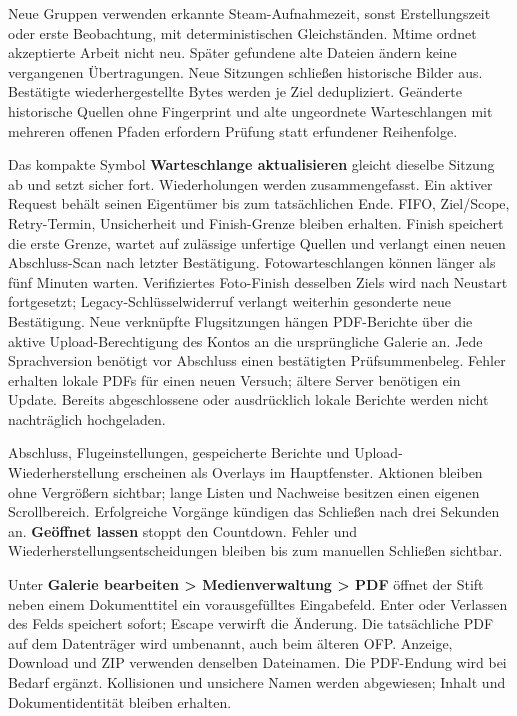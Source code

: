 \documentclass[11pt,a4paper]{article}
\newcommand{\ui}[1]{\textbf{#1}}
\begin{document}
Neue Gruppen verwenden erkannte Steam-Aufnahmezeit, sonst Erstellungszeit
oder erste Beobachtung, mit deterministischen Gleichständen. Mtime ordnet
akzeptierte Arbeit nicht neu. Später gefundene alte Dateien ändern keine
vergangenen Übertragungen. Neue Sitzungen schließen historische Bilder aus.
Bestätigte wiederhergestellte Bytes werden je Ziel dedupliziert. Geänderte
historische Quellen ohne Fingerprint und alte ungeordnete Warteschlangen mit
mehreren offenen Pfaden erfordern Prüfung statt erfundener Reihenfolge.

Das kompakte Symbol \ui{Warteschlange aktualisieren} gleicht dieselbe Sitzung
ab und setzt sicher fort. Wiederholungen werden zusammengefasst. Ein aktiver
Request behält seinen Eigentümer bis zum tatsächlichen Ende. FIFO, Ziel/Scope,
Retry-Termin, Unsicherheit und Finish-Grenze bleiben erhalten. Finish speichert
die erste Grenze, wartet auf zulässige unfertige Quellen und verlangt einen
neuen Abschluss-Scan nach letzter Bestätigung. Fotowarteschlangen können länger als fünf
Minuten warten. Verifiziertes Foto-Finish desselben Ziels wird nach Neustart
fortgesetzt; Legacy-Schlüsselwiderruf verlangt weiterhin gesonderte neue
Bestätigung. Neue verknüpfte Flugsitzungen hängen PDF-Berichte über die aktive
Upload-Berechtigung des Kontos an die ursprüngliche Galerie an.
Jede Sprachversion benötigt vor Abschluss einen bestätigten Prüfsummenbeleg.
Fehler erhalten lokale PDFs für einen neuen Versuch; ältere Server benötigen
ein Update. Bereits abgeschlossene oder ausdrücklich lokale Berichte werden
nicht nachträglich hochgeladen.

Abschluss, Flugeinstellungen, gespeicherte Berichte und Upload-Wiederherstellung
erscheinen als Overlays im Hauptfenster. Aktionen bleiben ohne Vergrößern
sichtbar; lange Listen und Nachweise besitzen einen eigenen Scrollbereich.
Erfolgreiche Vorgänge kündigen das Schließen nach drei Sekunden an.
\ui{Geöffnet lassen} stoppt den Countdown. Fehler und Wiederherstellungsentscheidungen
bleiben bis zum manuellen Schließen sichtbar.

Unter \ui{Galerie bearbeiten > Medienverwaltung > PDF} öffnet der Stift neben
einem Dokumenttitel ein vorausgefülltes Eingabefeld. Enter oder Verlassen
des Felds speichert sofort; Escape verwirft die Änderung. Die tatsächliche PDF
auf dem Datenträger wird umbenannt, auch beim älteren OFP. Anzeige, Download
und ZIP verwenden denselben Dateinamen. Die PDF-Endung wird bei Bedarf ergänzt.
Kollisionen und unsichere Namen werden abgewiesen; Inhalt und Dokumentidentität
bleiben erhalten.
\end{document}
